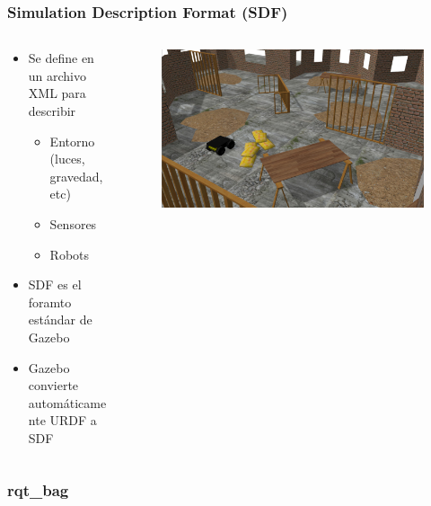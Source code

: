 \begin{frame}
    \frametitle{Simulation Description Format (SDF)}
 
     	\begin{columns}
    	\begin{column}{0.5\textwidth}
    		\begin{itemize}
    			\item Se define en un archivo XML para describir
	    		\begin{itemize}
    				\item Entorno (luces, gravedad, etc)
					\item Sensores
					\item Robots
    			\end{itemize}
			\item SDF es el foramto estándar de Gazebo
			\item Gazebo convierte automáticamente URDF a SDF 
    		\end{itemize}
    	\end{column}
    	\begin{column}{0.5\textwidth}
    		\begin{figure}[!h]
    			\centering
				\includegraphics[width=\columnwidth]{images/sdf_gazebo.jpg}
    		\end{figure}
    	\end{column}
    \end{columns}
    
\end{frame}


\begin{frame}
    \frametitle{rqt\_bag}
    

    
\end{frame}


